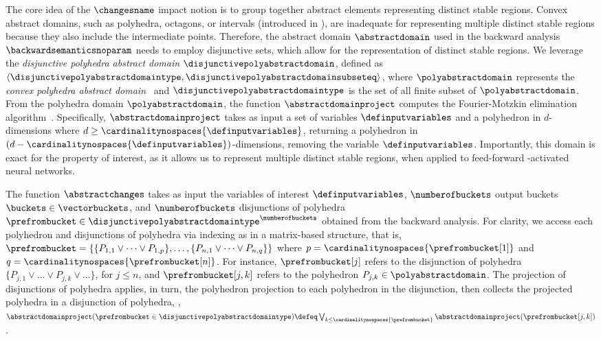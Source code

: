 The core idea of the $\changesname$ impact notion is to group together abstract elements representing distinct stable regions. Convex abstract domains, such as polyhedra, octagons, or intervals (introduced in ), are inadequate for representing multiple distinct stable regions because they also include the intermediate points. Therefore, the abstract domain $\abstractdomain$ used in the backward analysis $\backwardsemanticsnoparam$ needs to employ disjunctive sets, which allow for the representation of distinct stable regions.
%
We leverage the \textit{disjunctive polyhedra abstract domain} $\disjunctivepolyabstractdomain$, defined as
$
  \langle \disjunctivepolyabstractdomaintype, \disjunctivepolyabstractdomainsubseteq \rangle
$, where $\polyabstractdomain$ represents the \textit{convex polyhedra abstract domain}~ and $\disjunctivepolyabstractdomaintype$ is the set of all finite subset of $\polyabstractdomain$.
From the polyhedra domain $\polyabstractdomain$, the function $\abstractdomainproject$ computes the Fourier-Motzkin elimination algorithm~.
Specifically, $\abstractdomainproject$ takes as input a set of variables $\definputvariables$ and a polyhedron in $d$-dimensions where $d \ge \cardinalitynospaces{\definputvariables}$, returning a polyhedron in $(d-\cardinalitynospaces{\definputvariables})$-dimensions, removing the variable $\definputvariables$.
Importantly, this domain is exact for the property of interest, as it allows us to represent multiple distinct stable regions, when applied to feed-forward \relu-activated neural networks.

The function $\abstractchanges$ takes as input the variables of interest $\definputvariables$, $\numberofbuckets$ output buckets $\buckets\in\vectorbuckets$, and $\numberofbuckets$ disjunctions of polyhedra $\prefrombucket\in\disjunctivepolyabstractdomaintype^\numberofbuckets$ obtained from the backward analysis.
For clarity, we access each polyhedron and disjunctions of polyhedra via indexing as in a matrix-based structure, that is, $\prefrombucket=\{\{P_{1,1}\vee \dots\vee P_{1,p}\},\dots,\{P_{n,1}\vee \dots\vee P_{n,q}\}\}$ where $p = \cardinalitynospaces{\prefrombucket[1]}$ and $q = \cardinalitynospaces{\prefrombucket[n]}$. For instance, $\prefrombucket[j]$ refers to the disjunction of polyhedra $\{P_{j,1}\vee \dots\vee P_{j,k}\vee \dots\}$, for $j\le n$, and $\prefrombucket[{j, k}]$ refers to the polyhedron $P_{j,k}\in\polyabstractdomain$.
The projection of disjunctions of polyhedra applies, in turn, the polyhedron projection to each polyhedron in the disjunction, then collects the projected polyhedra in a disjunction of polyhedra, \ie, $\abstractdomainproject(\prefrombucket \in \disjunctivepolyabstractdomaintype) \defeq \bigvee_{k \le \cardinalitynospaces{\prefrombucket}} \abstractdomainproject(\prefrombucket[j, k])$.

